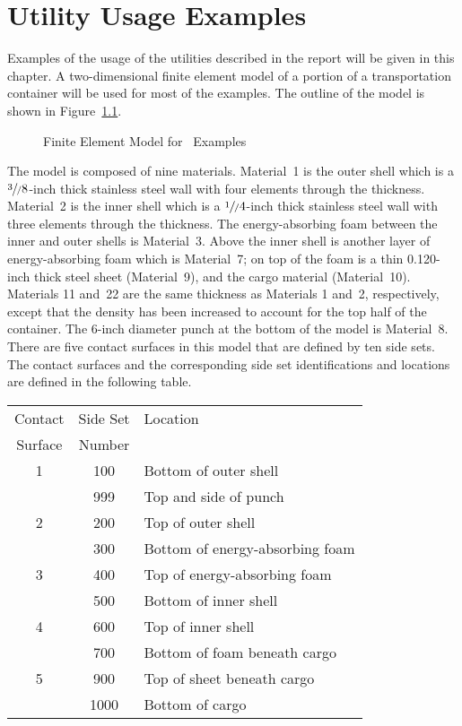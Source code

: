 \chapter{Utility Usage Examples}\label{c:examples}

Examples of the usage of the utilities described in the report will be
given in this chapter.  A two-dimensional finite element model of a
portion of a transportation container will be used for most of the
examples.  The outline of the model is shown in Figure~\ref{exmodel}.
\begin{figure}
\vspace{5.0in}
\caption{Finite Element Model for \numbers\ Examples}\label{exmodel}
\end{figure}
The model is composed of nine materials.  Material~1 is the outer shell
which is a $\sfrac3/8$-inch thick stainless steel wall with four
elements through the thickness.  Material~2 is the inner shell which is
a $\sfrac1/4$-inch thick stainless steel wall with three elements
through the thickness.  The energy-absorbing foam between the inner and
outer shells is Material~3.  Above the inner shell is another layer of
energy-absorbing foam which is Material~7;  on top of the foam is a thin
0.120-inch thick steel sheet (Material~9), and the cargo material
(Material~10).  Materials 11 and~22 are the same thickness as Materials
1 and~2, respectively, except that the density has been increased to
account for the top half of the container.  The 6-inch diameter punch at
the bottom of the model is Material~8.  There are five contact surfaces
in this model that are defined by ten side sets.  The contact surfaces
and the corresponding side set identifications and locations are defined
in the following table.

\begin{center}
\begin{tabular}{|ccl|}\hline
Contact  & Side Set  &  Location \\ 
Surface  & Number    &            \\ \hline \hline
      1  &  100      &  Bottom of outer shell \\
         &  999      &  Top and side of punch      \\ \hline
      2  &  200      &  Top of outer shell    \\
         &  300      &  Bottom of energy-absorbing foam  \\ \hline
      3  &  400      &  Top of energy-absorbing foam  \\
         &  500      &  Bottom of inner shell         \\ \hline
      4  &  600      &  Top of inner shell \\
         &  700      &  Bottom of foam beneath cargo  \\ \hline
      5  &  900      &  Top of sheet beneath cargo \\
         & 1000      &  Bottom of cargo   \\ \hline
\end{tabular}
\end{center}


